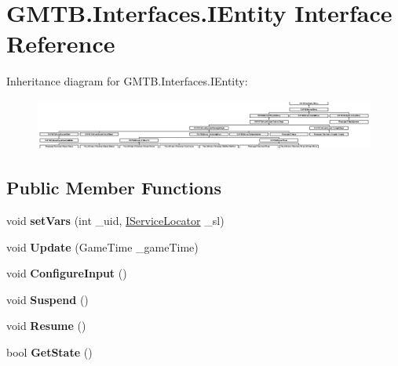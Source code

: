 \hypertarget{interface_g_m_t_b_1_1_interfaces_1_1_i_entity}{}\section{G\+M\+T\+B.\+Interfaces.\+I\+Entity Interface Reference}
\label{interface_g_m_t_b_1_1_interfaces_1_1_i_entity}
Inheritance diagram for G\+M\+T\+B.\+Interfaces.\+I\+Entity\+:\begin{figure}[H]
\begin{center}
\leavevmode
\includegraphics[height=1.676020cm]{interface_g_m_t_b_1_1_interfaces_1_1_i_entity}
\end{center}
\end{figure}
\subsection*{Public Member Functions}
\begin{DoxyCompactItemize}
\item 
\mbox{\label{interface_g_m_t_b_1_1_interfaces_1_1_i_entity_a1070c8961681e6772c8a9cc2bab28442}} 
void {\bfseries set\+Vars} (int \+\_\+uid, \mbox{\hyperlink{interface_g_m_t_b_1_1_interfaces_1_1_i_service_locator}{I\+Service\+Locator}} \+\_\+sl)
\item 
\mbox{\label{interface_g_m_t_b_1_1_interfaces_1_1_i_entity_aed260c50c9ef2fb82f5932d1a44a0df3}} 
void {\bfseries Update} (Game\+Time \+\_\+game\+Time)
\item 
\mbox{\label{interface_g_m_t_b_1_1_interfaces_1_1_i_entity_abc723c9c3846e2658c9aed63b27531b0}} 
void {\bfseries Configure\+Input} ()
\item 
\mbox{\label{interface_g_m_t_b_1_1_interfaces_1_1_i_entity_a009550bdbad8a2bd046939ab2f627e77}} 
void {\bfseries Suspend} ()
\item 
\mbox{\label{interface_g_m_t_b_1_1_interfaces_1_1_i_entity_a784a80753903318bab88e495a9a265f8}} 
void {\bfseries Resume} ()
\item 
\mbox{\label{interface_g_m_t_b_1_1_interfaces_1_1_i_entity_ac94558cbc049a71e97604b6f8ba07cc5}} 
bool {\bfseries Get\+State} ()
\end{DoxyCompactItemize}
